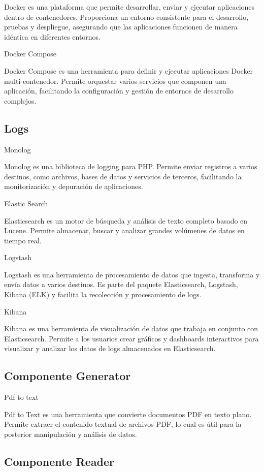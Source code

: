 Docker es una plataforma que permite desarrollar, enviar y ejecutar aplicaciones dentro de
contenedores.
Proporciona un entorno consistente para el desarrollo, pruebas y despliegue, asegurando que las aplicaciones funcionen
de manera idéntica en diferentes entornos.

Docker Compose

Docker Compose es una herramienta para definir y ejecutar aplicaciones Docker multi-contenedor.
Permite orquestar varios servicios que componen una aplicación, facilitando
la configuración y gestión de entornos de desarrollo complejos.

\subsection*{Logs}

Monolog

Monolog es una biblioteca de logging para PHP. Permite enviar registros a varios destinos, como archivos, bases de datos
y servicios de terceros, facilitando la monitorización y depuración de aplicaciones.

Elastic Search

Elasticsearch es un motor de búsqueda y análisis de texto completo basado en Lucene.
Permite almacenar, buscar y analizar grandes volúmenes de datos en tiempo real.

Logstash

Logstash es una herramienta de procesamiento de datos que ingesta, transforma y envía datos a varios
destinos.
Es parte del paquete Elasticsearch, Logstash, Kibana (ELK) y facilita la recolección y procesamiento de logs.

Kibana

Kibana es una herramienta de visualización de datos que trabaja en conjunto con Elasticsearch.
Permite a los usuarios crear gráficos y dashboards interactivos para visualizar y analizar los datos de logs almacenados
en Elasticsearch.

\subsection*{Componente Generator}

Pdf to text

Pdf to Text es una herramienta que convierte documentos PDF en texto plano.
Permite extraer el contenido textual de archivos PDF, lo cual es útil para la posterior manipulación y análisis de
datos.

\subsection*{Componente Reader}

